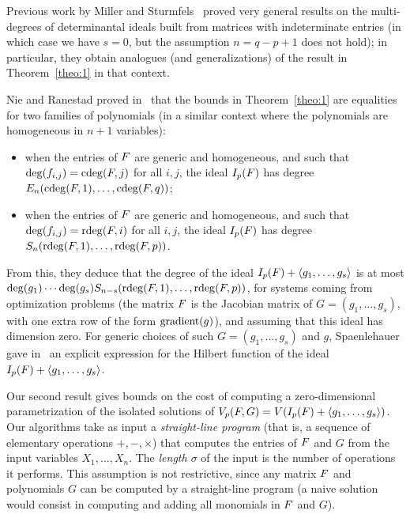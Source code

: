\documentclass[12pt]{article}
\begin{document}
Previous work by Miller and Sturmfels~\cite[Chapter~15]{MiSt04} proved
very general results on the multi-degrees of determinantal ideals
built from matrices with indeterminate entries (in which case we have
$s=0$, but the assumption $n=q-p+1$ does not hold); in particular,
they obtain analogues (and generalizations) of the result in
Theorem~\ref{theo:1} in that context.

Nie and Ranestad proved in~\cite{NieRan09} that the bounds in
Theorem~\ref{theo:1} are equalities for two families of polynomials
(in a similar context where the polynomials are homogeneous in
$n+1$ variables):
\begin{itemize}
\item when the entries of ${F}$ are generic and homogeneous, and
 such that $\deg(f_{i,j}) = \mathrm{cdeg}({F},j)$ for all $i,j$, the ideal
 $I_p({F})$ has degree $E_{n}(\mathrm{cdeg}({F},1), \ldots, \mathrm{cdeg}({F},q))$;
\item when the entries of ${F}$ are  generic and homogeneous, and
  such that $\deg(f_{i,j}) = \mathrm{rdeg}({F},i)$ for all $i,j$, the
  ideal  $I_p({F})$ has degree $S_{n}(\mathrm{rdeg}({F},1), \ldots, \mathrm{rdeg}({F},p))$.
\end{itemize}
From this, they deduce that the degree of the ideal $I_p({F}) +
\langle g_1,\dots,g_s \rangle$ is at most \sloppy $\deg(g_1) \cdots
\deg(g_s) S_{n-s}(\mathrm{rdeg}({F},1), \ldots, \mathrm{rdeg}({F},p))$, for systems
coming from optimization problems (the matrix ${F}$ is the Jacobian
matrix of $G=(g_1,\dots,g_s)$, with one extra row of the form ${\rm
  gradient}(g)$), and assuming that this ideal has dimension zero.
For generic choices of such $G=(g_1,\dots,g_s)$ and $g$,
Spaenlehauer gave in~\cite{Spa14} an explicit expression for the
Hilbert function of the ideal $I_p({F}) + \langle g_1,\dots,g_s
\rangle$.

\medskip

Our second result gives bounds on the cost of computing a
zero-dimensional parametrization of the isolated solutions of
$V_{p}({F},G)=V(I_p({F}) + \langle g_1,\dots,g_s \rangle)$. Our algorithms take as
input a \emph{straight-line program} (that is, a sequence of
elementary operations $+, -, \times$) that computes the entries of
${F}$ and $G$ from the input variables $X_1,\dots,X_n$. The
\emph{length $\sigma$} of the input is the number of operations it
performs. This assumption is not restrictive, since any matrix ${F}$
and polynomials $G$ can be computed by a straight-line program
(a naive solution would consist in computing and adding all monomials
in ${F}$ and $G$).
\end{document}
